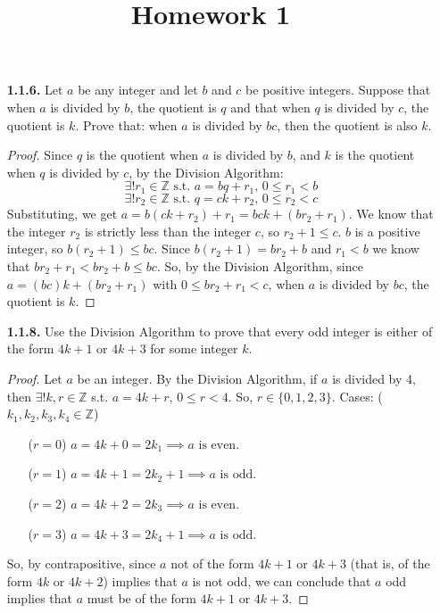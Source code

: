 \documentclass[12pt]{article}
\title{Homework 1}
\newcommand{\zee}{\mathbb{Z}}
\begin{document}
\begin{itemize}
\item[\textbf{1.1.6.}] Let $a$ be any integer and let $b$ and $c$ be positive integers.
Suppose that when $a$ is divided by $b$, the quotient is $q$ and that when $q$ is divided by $c$, the quotient is $k$.
Prove that: when $a$ is divided by $bc$, then the quotient is also $k$.

\begin{proof}
Since $q$ is the quotient when $a$ is divided by $b$, and $k$ is the quotient when $q$ is divided by $c$, by the Division Algorithm:
\[\exists! r_1 \in \zee \text{ s.t. } a = b q + r_1 \text{, } 0 \leq r_1 < b \]
\[\exists! r_2 \in \zee \text{ s.t. } q = c k + r_2 \text{, } 0 \leq r_2 < c \]
Substituting, we get $a = b (c k + r_2) + r_1 = b c k + (b r_2 + r_1)$.
We know that the integer $r_2$ is strictly less than the integer $c$, so $r_2 + 1 \leq c$.
$b$ is a positive integer, so $b(r_2 + 1) \leq b c$.
Since $b(r_2 + 1) = b r_2 + b$ and $r_1 < b$ we know that $b r_2 + r_1 < b r_2 + b \leq b c$.
So, by the Division Algorithm, since $a = (b c)k + (b r_2 + r_1)$ with $0 \leq b r_2 + r_1 < c$, when $a$ is divided by $bc$, the quotient is $k$.
\end{proof}



\item[\textbf{1.1.8.}] Use the Division Algorithm to prove that every odd integer is either of the form $4k+1$ or $4k+3$ for some integer $k$.

\begin{proof}
Let $a$ be an integer.
By the Division Algorithm, if $a$ is divided by 4, then $\exists! k,r \in \zee$ s.t. $a = 4 k + r$, $0 \leq r < 4$. So, $r \in \{0, 1, 2, 3\}$.
Cases: ($k_1, k_2, k_3, k_4 \in \zee$)
\begin{itemize}
\item[($r = 0$)] $a = 4 k + 0 = 2 k_1 \implies a \text{ is even}$.
\item[($r = 1$)] $a = 4 k + 1 = 2 k_2 + 1 \implies a \text{ is odd}$.
\item[($r = 2$)] $a = 4 k + 2 = 2 k_3 \implies a \text{ is even}$.
\item[($r = 3$)] $a = 4 k + 3 = 2 k_4 + 1 \implies a \text{ is odd}$.
\end{itemize}
So, by contrapositive, since $a$ not of the form $4 k + 1$ or $4 k + 3$ (that is, of the form $4 k$ or $4 k + 2$) implies that $a$ is not odd, we can conclude that $a$ odd implies that $a$ must be of the form $4 k + 1$ or $4 k + 3$.
\end{proof}




\end{itemize}
\end{document}
